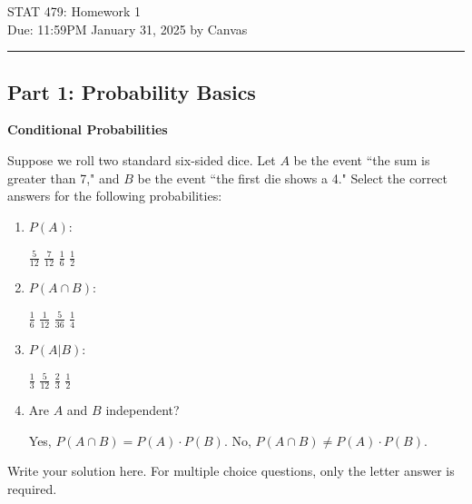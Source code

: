 \documentclass[12pt,letterpaper, onecolumn]{exam}
\begin{document}
\begingroup  
    \centering
    \LARGE STAT 479: Homework 1\\[0.5em]
    \large Due: 11:59PM January 31, 2025 by Canvas\\[0.5em]
\endgroup
\rule{\textwidth}{0.4pt}
\pointsdroppedatright   %
\printanswers
\renewcommand{\solutiontitle}{\noindent\textbf{Answer:}\enspace}


\begin{questions}
\section*{Part 1: Probability Basics}

\question[10 points]\textbf{Conditional Probabilities}\droppoints

Suppose we roll two standard six-sided dice. Let \( A \) be the event ``the sum is greater than 7," and \( B \) be the event ``the first die shows a 4." Select the correct answers for the following probabilities:
\begin{enumerate}[label=(\alph*)]
    \item \( P(A) \):
    \begin{choices}
        \choice \( \frac{5}{12} \)
        \choice \( \frac{7}{12} \)
        \choice \( \frac{1}{6} \)
        \choice \( \frac{1}{2} \)
    \end{choices}
    \item \( P(A \cap B) \):
    \begin{choices}
        \choice \( \frac{1}{6} \)
        \choice \( \frac{1}{12} \)
        \choice \( \frac{5}{36} \)
        \choice \( \frac{1}{4} \)
    \end{choices}
    \item \( P(A | B) \):
    \begin{choices}
        \choice \( \frac{1}{3} \)
        \choice \( \frac{5}{12} \)
        \choice \( \frac{2}{3} \)
        \choice \( \frac{1}{2} \)
    \end{choices}
    \item Are \( A \) and \( B \) independent?
    \begin{choices}
        \choice Yes, \( P(A \cap B) = P(A) \cdot P(B) \).
        \choice No, \( P(A \cap B) \neq P(A) \cdot P(B) \).
    \end{choices}
\end{enumerate}


\begin{solution}
        Write your solution here. For multiple choice questions, only the letter answer is required.
    \begin{parts}

\end{parts}
\end{solution}
\end{questions}
\end{document}
